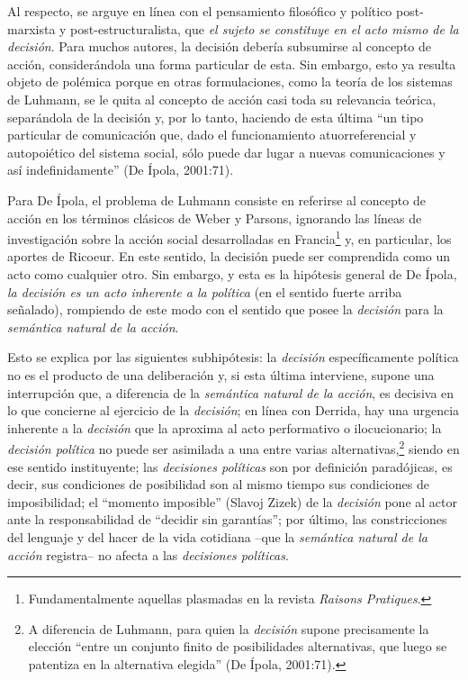 Al respecto, se arguye en línea con el pensamiento filosófico y político post-marxista y post-estructuralista, que \emph{el sujeto se constituye en el acto mismo de la} \emph{decisión}. Para muchos autores, la decisión debería subsumirse al concepto de acción, considerándola una forma particular de esta. Sin embargo, esto ya resulta objeto de polémica porque en otras formulaciones, como la teoría de los sistemas de Luhmann, se le quita al concepto de acción casi toda su relevancia teórica, separándola de la decisión y, por lo tanto, haciendo de esta última ``un tipo particular de comunicación que, dado el funcionamiento atuorreferencial y autopoiético del sistema social, sólo puede dar lugar a nuevas comunicaciones y así indefinidamente'' (De Ípola, 2001:71).

Para De Ípola, el problema de Luhmann consiste en referirse al concepto de acción en los términos clásicos de Weber y Parsons, ignorando las líneas de investigación sobre la acción social desarrolladas en Francia\footnote{Fundamentalmente aquellas plasmadas en la revista \emph{Raisons Pratiques}.} y, en particular, los aportes de Ricoeur. En este sentido, la decisión puede ser comprendida como un acto como cualquier otro. Sin embargo, y esta es la hipótesis general de De Ípola, \emph{la decisión es un acto inherente a la política} (en el sentido fuerte arriba señalado), rompiendo de este modo con el sentido que posee la \emph{decisión} para la \emph{semántica natural de la acción}.

Esto se explica por las siguientes subhipótesis: la \emph{decisión} específicamente política no es el producto de una deliberación y, si esta última interviene, supone una interrupción que, a diferencia de la \emph{semántica natural de la acción}, es decisiva en lo que concierne al ejercicio de la \emph{decisión}; en línea con Derrida, hay una urgencia inherente a la \emph{decisión} que la aproxima al acto performativo o ilocucionario; la \emph{decisión política} no puede ser asimilada a una entre varias alternativas,\footnote{A diferencia de Luhmann, para quien la \emph{decisión} supone precisamente la elección ``entre un conjunto finito de posibilidades alternativas, que luego se patentiza en la alternativa elegida'' (De Ípola, 2001:71).} siendo en ese sentido instituyente; las \emph{decisiones políticas} son por definición paradójicas, es decir, sus condiciones de posibilidad son al mismo tiempo sus condiciones de imposibilidad; el ``momento imposible'' (Slavoj Zizek) de la \emph{decisión} pone al actor ante la responsabilidad de ``decidir sin garantías''; por último, las constricciones del lenguaje y del hacer de la vida cotidiana --que la \emph{semántica natural de la acción} registra-- no afecta a las \emph{decisiones políticas}.

